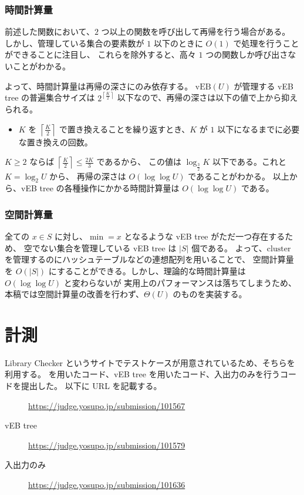 \documentclass[dvipdfmx,a4j,10pt]{jarticle}
\begin{document}
\subsubsection{時間計算量}

前述した関数において、$2$ つ以上の関数を呼び出して再帰を行う場合がある。
しかし、管理している集合の要素数が $1$ 以下のときに $O(1)$ で処理を行うことができることに注目し、
これらを除外すると、高々 $1$ つの関数しか呼び出さないことがわかる。

よって、時間計算量は再帰の深さにのみ依存する。
$\mathrm{vEB}(U)$ が管理する vEB tree の普遍集合サイズは $2^{\left\lceil \frac{K}{2} \right\rceil}$ 以下なので、再帰の深さは以下の値で上から抑えられる。

\begin{itemize}
  \item $K$ を $\left\lceil \frac{K}{2} \right\rceil$ で置き換えることを繰り返すとき、$K$ が $1$ 以下になるまでに必要な置き換えの回数。
\end{itemize}

$K \geq 2$ ならば $\left\lceil \frac{K}{2} \right\rceil \leq \frac{2K}{3}$ であるから、
この値は $\log_{\frac{3}{2}}{K}$ 以下である。これと $K = \log_2{U}$ から、
再帰の深さは $O(\log \log U)$ であることがわかる。
以上から、vEB tree の各種操作にかかる時間計算量は $O(\log \log U)$ である。

\subsubsection{空間計算量}

全ての $x \in S$ に対し、$\min = x$ となるような vEB tree がただ一つ存在するため、
空でない集合を管理している vEB tree は $|S|$ 個である。
よって、$\mathrm{cluster}$ を管理するのにハッシュテーブルなどの連想配列を用いることで、
空間計算量を $O(|S|)$ にすることができる。しかし、理論的な時間計算量は $O(\log \log U)$ と変わらないが
実用上のパフォーマンスは落ちてしまうため、本稿では空間計算量の改善を行わず、$\Theta(U)$ のものを実装する。

\section{計測}

Library Checker というサイトでテストケースが用意されているため、そちらを利用する。
 を用いたコード、vEB tree を用いたコード、入出力のみを行うコードを提出した。
以下に URL を記載する。

\begin{description}
  \item[] \url{https://judge.yosupo.jp/submission/101567}
  \item[vEB tree] \url{https://judge.yosupo.jp/submission/101579}
  \item[入出力のみ] \url{https://judge.yosupo.jp/submission/101636}
\end{description}
\end{document}
